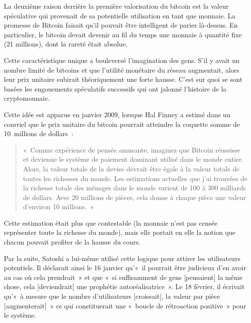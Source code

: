La deuxième raison derrière la première valorisation du bitcoin est la valeur spéculative qui provenait de sa potentielle utilisation en tant que monnaie. La promesse de Bitcoin faisait qu'il pouvait être intelligent de parier là-dessus. En particulier, le bitcoin devait devenir au fil du temps une monnaie à quantité fixe (21 millions), dont la rareté était absolue.

Cette caractéristique unique a bouleversé l'imagination des gens. S'il y avait un nombre limité de bitcoins et que l'utilité monétaire du réseau augmentait, alors leur prix unitaire subirait théoriquement une forte hausse. C'est sur quoi se sont basées les engouements spéculatifs successifs qui ont jalonné l'histoire de la cryptomonnaie.

Cette idée est apparue en janvier 2009, lorsque Hal Finney a estimé dans un courriel que le prix unitaire du bitcoin pourrait atteindre la coquette somme de 10~millions de dollars~: 

\begin{quote}
«~Comme expérience de pensée amusante, imaginez que Bitcoin réussisse et devienne le système de paiement dominant utilisé dans le monde entier. Alors, la valeur totale de la devise devrait être égale à la valeur totale de toutes les richesses du monde. Les estimations actuelles que j'ai trouvées de la richesse totale des ménages dans le monde varient de 100 à 300 milliards de dollars. Avec 20 millions de pièces, cela donne à chaque pièce une valeur d'environ 10 millions.~»
\end{quote}

Cette estimation était plus que contestable (la monnaie n'est pas censée représenter toute la richesse du monde), mais elle portait en elle la notion que chacun pouvait profiter de la hausse du cours.

Par la suite, Satoshi a lui-même utilisé cette logique pour attirer les utilisateurs potentiels. Il déclarait ainsi le 16 janvier qu'«~il pourrait être judicieux d'en avoir au cas où cela prendrait~» et que «~si suffisamment de gens [pensaient] la même chose, cela [deviendrait] une prophétie autoréalisatrice~». Le 18 février, il écrivait qu'«~à mesure que le nombre d'utilisateurs [croissait], la valeur par pièce [augmenterait]~» ce qui constituerait une «~boucle de rétroaction positive~» pour le système.

